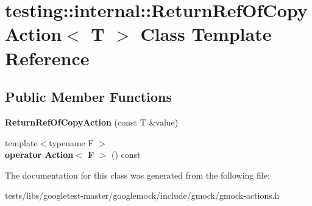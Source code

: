 \hypertarget{classtesting_1_1internal_1_1ReturnRefOfCopyAction}{}\section{testing\+:\+:internal\+:\+:Return\+Ref\+Of\+Copy\+Action$<$ T $>$ Class Template Reference}
\label{classtesting_1_1internal_1_1ReturnRefOfCopyAction}
\subsection*{Public Member Functions}
\begin{DoxyCompactItemize}
\item 
\mbox{\label{classtesting_1_1internal_1_1ReturnRefOfCopyAction_a073c18a8b50423b08f6603e860622839}} 
{\bfseries Return\+Ref\+Of\+Copy\+Action} (const T \&value)
\item 
\mbox{\label{classtesting_1_1internal_1_1ReturnRefOfCopyAction_a8b4829fbb46c3ca6468f3eb5c5b42493}} 
{\footnotesize template$<$typename F $>$ }\\{\bfseries operator Action$<$ F $>$} () const
\end{DoxyCompactItemize}


The documentation for this class was generated from the following file\+:\begin{DoxyCompactItemize}
\item 
tests/libs/googletest-\/master/googlemock/include/gmock/gmock-\/actions.\+h\end{DoxyCompactItemize}
